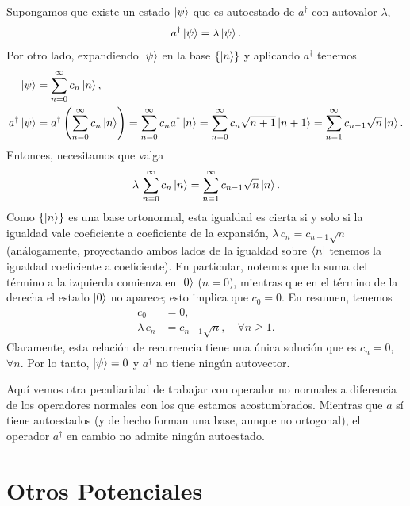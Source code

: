 \documentclass[10pt, a4paper]{article}
\numberwithin{equation}{subsection}
\begin{document}
Supongamos que existe un estado $\ket{\psi}$ que es autoestado de $a^\dagger$
con autovalor $\lambda$,
\begin{equation}
  a^\dagger\ket{\psi} = \lambda\ket{\psi}.
\end{equation}
Por otro lado, expandiendo $\ket{\psi}$ en la base $\set{\ket{n}}$ y aplicando
$a^\dagger$ tenemos
\begin{align}
  \ket{\psi} &= \sum_{n=0}^\infty c_n\ket{n}, \\
  a^\dagger\ket{\psi} &= a^\dagger\left(\sum_{n=0}^\infty c_n\ket{n}\right) =
    \sum_{n=0}^\infty c_na^\dagger\ket{n} = \sum_{n=0}^\infty
    c_n\sqrt{n+1}\ket{n+1} = \sum_{n=1}^\infty c_{n-1}\sqrt{n}\ket{n}.
\end{align}
Entonces, necesitamos que valga
\begin{equation}
  \lambda\,\sum_{n=0}^\infty c_n\ket{n} = \sum_{n=1}^\infty
    c_{n-1}\sqrt{n}\ket{n}.
\end{equation}
Como $\set{\ket{n}}$ es una base ortonormal, esta igualdad es cierta si y solo
si la igualdad vale coeficiente a coeficiente de la expansión, $\lambda\,c_n =
c_{n-1}\sqrt{n}$ (análogamente, proyectando ambos lados de la igualdad sobre
$\bra{n}$ tenemos la igualdad coeficiente a coeficiente). En particular,
notemos que la suma del término a la izquierda comienza en $\ket{0}$ ($n = 0$),
mientras que en el término de la derecha el estado $\ket{0}$ no aparece; esto
implica que $c_0 = 0$. En resumen, tenemos
\begin{align}
  c_0 &= 0, \\
  \lambda\,c_n &= c_{n-1}\sqrt{n}, \quad\forall n \geq 1.
\end{align}
Claramente, esta relación de recurrencia tiene una única solución que es $c_n =
0$, $\forall n$. Por lo tanto, $\ket{\psi} = 0$ y $a^\dagger$ no tiene ningún
autovector.

\bigbreak

Aquí vemos otra peculiaridad de trabajar con operador no normales a diferencia
de los operadores normales con los que estamos acostumbrados. Mientras que $a$
sí tiene autoestados (y de hecho forman una base, aunque no ortogonal), el
operador $a^\dagger$ en cambio no admite ningún autoestado.

\section{Otros Potenciales}
\end{document}
